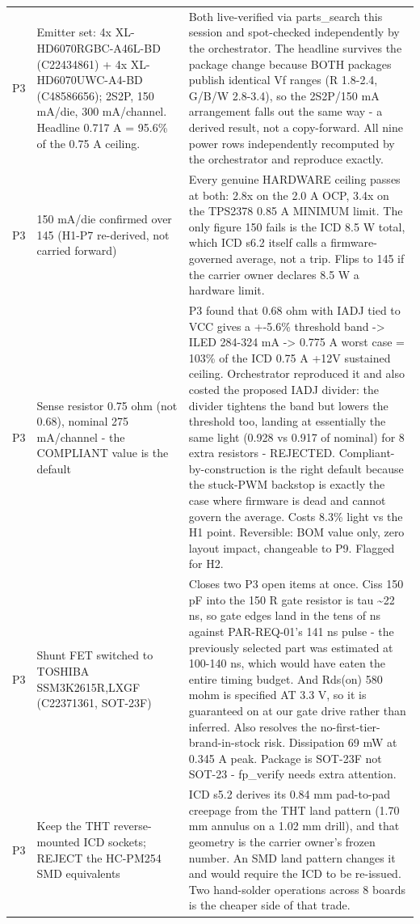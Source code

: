 \documentclass[11pt,a4paper]{article}
\begin{document}
{\begin{longtable}{lp{5.2cm}p{7.2cm}}
P3 & Emitter set: 4x XL-HD6070RGBC-A46L-BD (C22434861) + 4x XL-HD6070UWC-A4-BD (C48586656); 2S2P, 150 mA/die, 300 mA/channel. Headline 0.717 A = 95.6\% of the 0.75 A ceiling. & Both live-verified via parts\_search this session and spot-checked independently by the orchestrator. The headline survives the package change because BOTH packages publish identical Vf ranges (R 1.8-2.4, G/B/W 2.8-3.4), so the 2S2P/150 mA arrangement falls out the same way - a derived result, not a copy-forward. All nine power rows independently recomputed by the orchestrator and reproduce exactly. \\
P3 & 150 mA/die confirmed over 145 (H1-P7 re-derived, not carried forward) & Every genuine HARDWARE ceiling passes at both: 2.8x on the 2.0 A OCP, 3.4x on the TPS2378 0.85 A MINIMUM limit. The only figure 150 fails is the ICD 8.5 W total, which ICD s6.2 itself calls a firmware-governed average, not a trip. Flips to 145 if the carrier owner declares 8.5 W a hardware limit. \\
P3 & Sense resistor 0.75 ohm (not 0.68), nominal 275 mA/channel - the COMPLIANT value is the default & P3 found that 0.68 ohm with IADJ tied to VCC gives a +-5.6\% threshold band -\textgreater{} ILED 284-324 mA -\textgreater{} 0.775 A worst case = 103\% of the ICD 0.75 A +12V sustained ceiling. Orchestrator reproduced it and also costed the proposed IADJ divider: the divider tightens the band but lowers the threshold too, landing at essentially the same light (0.928 vs 0.917 of nominal) for 8 extra resistors - REJECTED. Compliant-by-construction is the right default because the stuck-PWM backstop is exactly the case where firmware is dead and cannot govern the average. Costs 8.3\% light vs the H1 point. Reversible: BOM value only, zero layout impact, changeable to P9. Flagged for H2. \\
P3 & Shunt FET switched to TOSHIBA SSM3K2615R,LXGF (C22371361, SOT-23F) & Closes two P3 open items at once. Ciss 150 pF into the 150 R gate resistor is tau \textasciitilde{}22 ns, so gate edges land in the tens of ns against PAR-REQ-01's 141 ns pulse - the previously selected part was estimated at 100-140 ns, which would have eaten the entire timing budget. And Rds(on) 580 mohm is specified AT 3.3 V, so it is guaranteed on at our gate drive rather than inferred. Also resolves the no-first-tier-brand-in-stock risk. Dissipation 69 mW at 0.345 A peak. Package is SOT-23F not SOT-23 - fp\_verify needs extra attention. \\
P3 & Keep the THT reverse-mounted ICD sockets; REJECT the HC-PM254 SMD equivalents & ICD s5.2 derives its 0.84 mm pad-to-pad creepage from the THT land pattern (1.70 mm annulus on a 1.02 mm drill), and that geometry is the carrier owner's frozen number. An SMD land pattern changes it and would require the ICD to be re-issued. Two hand-solder operations across 8 boards is the cheaper side of that trade. \\

\end{longtable}}
\end{document}
